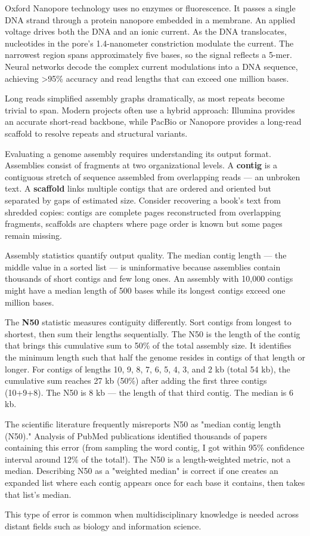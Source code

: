 Oxford Nanopore technology uses no enzymes or fluorescence. It passes a single DNA strand through a protein nanopore embedded in a membrane. An applied voltage drives both the DNA and an ionic current. As the DNA translocates, nucleotides in the pore's 1.4-nanometer constriction modulate the current. The narrowest region spans approximately five bases, so the signal reflects a 5-mer. Neural networks decode the complex current modulations into a DNA sequence, achieving >95\% accuracy and read lengths that can exceed one million bases.

Long reads simplified assembly graphs dramatically, as most repeats become trivial to span. Modern projects often use a hybrid approach: Illumina provides an accurate short-read backbone, while PacBio or Nanopore provides a long-read scaffold to resolve repeats and structural variants.

\begin{commentary}
Evaluating a genome assembly requires understanding its output format. Assemblies consist of fragments at two organizational levels. A \textbf{contig} is a contiguous stretch of sequence assembled from overlapping reads — an unbroken text. A \textbf{scaffold} links multiple contigs that are ordered and oriented but separated by gaps of estimated size. Consider recovering a book's text from shredded copies: contigs are complete pages reconstructed from overlapping fragments, scaffolds are chapters where page order is known but some pages remain missing.

Assembly statistics quantify output quality. The median contig length — the middle value in a sorted list — is uninformative because assemblies contain thousands of short contigs and few long ones. An assembly with 10,000 contigs might have a median length of 500 bases while its longest contigs exceed one million bases.

The \textbf{N50} statistic measures contiguity differently. Sort contigs from longest to shortest, then sum their lengths sequentially. The N50 is the length of the contig that brings this cumulative sum to 50\% of the total assembly size. It identifies the minimum length such that half the genome resides in contigs of that length or longer. For contigs of lengths 10, 9, 8, 7, 6, 5, 4, 3, and 2 kb (total 54 kb), the cumulative sum reaches 27 kb (50\%) after adding the first three contigs (10+9+8). The N50 is 8 kb — the length of that third contig. The median is 6 kb.

The scientific literature frequently misreports N50 as "median contig length (N50)." Analysis of PubMed publications identified thousands of papers containing this error (from sampling the word contig, I got within 95\% confidence interval around 12\% of the total!). The N50 is a length-weighted metric, not a median. Describing N50 as a "weighted median" is correct if one creates an expanded list where each contig appears once for each base it contains, then takes that list's median.

This type of error is common when multidisciplinary knowledge is needed across distant fields such as biology and information science.
\end{commentary}

